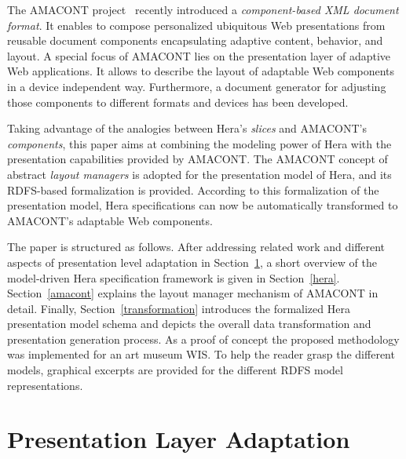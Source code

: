 \documentclass[oribibl]{llncs}
\begin{document}
The AMACONT project~\cite{amacont:jwe} recently introduced a \emph{component-based XML document format}. 
It enables to compose personalized ubiquitous Web presentations 
from reusable document components encapsulating adaptive content, behavior, 
and layout. 
A special focus of AMACONT lies on the presentation layer of adaptive Web 
applications. 
It allows to describe the layout of adaptable Web components in a device independent way.
Furthermore, a document generator for adjusting those components to different formats and devices has been developed.

Taking advantage of the analogies between Hera's \emph{slices} and AMACONT's \emph{components}, this paper aims at combining the modeling power of Hera with the presentation capabilities provided by AMACONT.
The AMACONT concept of abstract \emph{layout managers} is adopted for the presentation model of Hera, and its RDFS-based formalization is provided.
According to this formalization of the presentation model, Hera specifications can now be automatically transformed to AMACONT's adaptable Web components.

The paper is structured as follows.
After addressing related work and different aspects of 
presentation level adaptation in Section~\ref{pres_adapt}, a
short overview of the model-driven Hera specification framework is given
in Section~\ref{hera}. 
Section~\ref{amacont} explains the layout manager mechanism of AMACONT in detail.
Finally, Section~\ref{transformation} introduces the formalized Hera presentation model schema and depicts the 
overall data transformation and presentation generation process.
As a proof of concept the proposed methodology was implemented for an art museum WIS. 
To help the reader grasp the different models, graphical excerpts are provided for the different RDFS model representations. 

\section{Presentation Layer Adaptation}
\label{pres_adapt}
\end{document}

